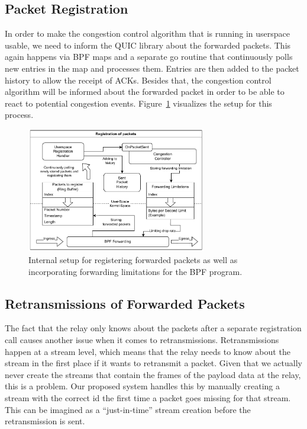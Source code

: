 \subsection{Packet Registration}
In order to make the congestion control algorithm that is running in userspace
usable, we need to inform the QUIC library about the forwarded packets.
This again happens via BPF maps and a separate go routine that continuously
polls new entries in the map and processes them.
Entries are then added to the packet history to allow the receipt of ACKs.
Besides that, the congestion control algorithm will be informed about the
forwarded packet in order to be able to react to potential congestion events.
Figure~\ref{fig:forward-registration} visualizes the setup for this process.
\begin{figure}[H]
    \centering
    \includegraphics[width=0.7\textwidth]{figures/03_fast_relays/forward-registration.drawio.pdf}
    \caption[Packet registration schematic]{Internal setup for registering forwarded packets as well as incorporating forwarding
    limitations for the BPF program.}\label{fig:forward-registration}
\end{figure}

\subsection{Retransmissions of Forwarded Packets}
The fact that the relay only knows about the packets after a separate registration call causes 
another issue when it comes to retransmissions.
Retransmissions happen at a stream level, which means that the relay needs to know about the 
stream in the first place if it wants to retransmit a packet.
Given that we actually never create the streams that contain the frames of the payload data 
at the relay, this is a problem.
Our proposed system handles this by manually creating a stream with the correct id the first
time a packet goes missing for that stream.
This can be imagined as a ``just-in-time'' stream creation before the retransmission is sent.

